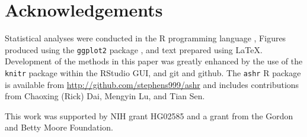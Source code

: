 \section*{Acknowledgements}

Statistical analyses were conducted in the {\sf R} programming language \cite{Rcore:2012}, Figures produced using the {\tt ggplot2} package \cite{ggplot2}, and text
prepared using \LaTeX. Development of the methods in this paper was greatly enhanced by the use of the {\tt knitr} package \cite{xie2013dynamic}  within the RStudio GUI, and 
git and github. The {\tt ashr} R package is available from \url{http://github.com/stephens999/ashr} and includes contributions 
from Chaoxing (Rick) Dai, Mengyin Lu, and Tian Sen.

This work was supported by NIH grant HG02585 and a grant from the Gordon and Betty Moore Foundation.